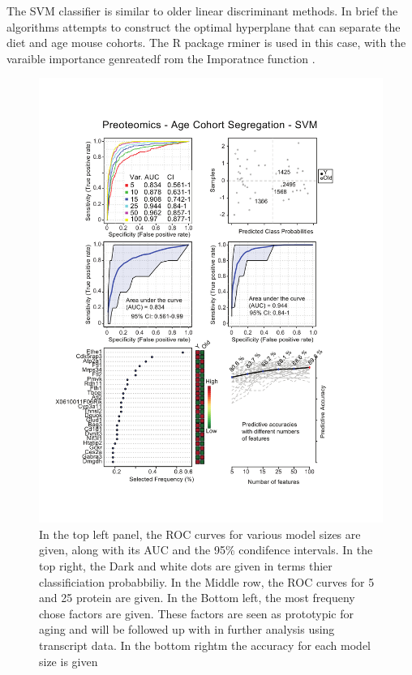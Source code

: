 \documentclass[a4paper,11pt,twoside]{book}
\begin{document}
	The SVM classifier is similar to older linear discriminant methods. In brief the algorithms attempts to construct the optimal hyperplane that can separate the diet and age mouse cohorts\citep{Shawe-Taylor2011SVM}. The R package rminer is used in this case, with the varaible importance genreatedf rom the Imporatnce function \citep{Cortez2016}.
	
	\begin{figure}[htb!]
		\centering
		\includegraphics[width=1.1\linewidth]{"3.Proteomics/Proteomics_Vingette_SVM_Age"}
		\caption[SVM Classifier for Young and Old Mice using Proteins]{In the top left panel, the ROC curves for various model sizes are given, along with its AUC and the 95\% condifence intervals. In the top right, the Dark and white dots are given in terms thier classificiation probabbiliy. In the Middle row, the ROC curves for 5 and 25 protein are given. In the Bottom left, the most frequeny chose factors are given. These factors are seen as prototypic for aging and will be followed up with in further analysis using transcript data. In the bottom rightm the accuracy for each model size is given}
		\label{fig:proteomicsvingettesvm}
	\end{figure}
	
\end{document}
